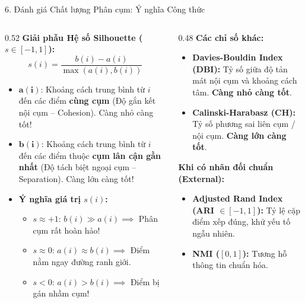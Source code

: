 \documentclass[aspectratio=169,10pt]{beamer}
\begin{document}
\begin{frame}{6. Đánh giá Chất lượng Phân cụm: Ý nghĩa Công thức}
  \footnotesize
  \begin{columns}[T]
    \begin{column}{0.52\textwidth}
      \textbf{Giải phẫu Hệ số Silhouette ($s \in [-1, 1]$):}
      $$s(i) = \frac{b(i) - a(i)}{\max(a(i), b(i))}$$
      \begin{itemize}\setlength{\itemsep}{1.5pt}
        \item $\mathbf{a(i)}$: Khoảng cách trung bình từ $i$ đến các điểm \textbf{cùng cụm} (Độ gắn kết nội cụm -- Cohesion). Càng nhỏ càng tốt!
        \item $\mathbf{b(i)}$: Khoảng cách trung bình từ $i$ đến các điểm thuộc \textbf{cụm lân cận gần nhất} (Độ tách biệt ngoại cụm -- Separation). Càng lớn càng tốt!
        \item \textbf{Ý nghĩa giá trị $s(i)$:}
          \begin{itemize}
            \item $s \approx +1$: $b(i) \gg a(i) \implies$ Phân cụm rất hoàn hảo!
            \item $s \approx 0$: $a(i) \approx b(i) \implies$ Điểm nằm ngay đường ranh giới.
            \item $s < 0$: $a(i) > b(i) \implies$ Điểm bị gán nhầm cụm!
          \end{itemize}
      \end{itemize}
    \end{column}
    \begin{column}{0.48\textwidth}
      \textbf{Các chỉ số khác:}
      \begin{itemize}\setlength{\itemsep}{2pt}
        \item \textbf{Davies-Bouldin Index (DBI):} Tỷ số giữa độ tản mát nội cụm và khoảng cách tâm. \textbf{Càng nhỏ càng tốt}.
        \item \textbf{Calinski-Harabasz (CH):} Tỷ số phương sai liên cụm / nội cụm. \textbf{Càng lớn càng tốt}.
      \end{itemize}
      \vspace{0.3em}
      \textbf{Khi có nhãn đối chuẩn (External):}
      \begin{itemize}\setlength{\itemsep}{1.5pt}
        \item \textbf{Adjusted Rand Index (ARI $\in [-1, 1]$):} Tỷ lệ cặp điểm xếp đúng, khử yếu tố ngẫu nhiên.
        \item \textbf{NMI ($[0, 1]$):} Tương hỗ thông tin chuẩn hóa.
      \end{itemize}
    \end{column}
  \end{columns}
\end{frame}
\end{document}
